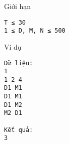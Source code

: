 Giới hạn
\begin{verbatim}
T ≤ 30
1 ≤ D, M, N ≤ 500
\end{verbatim}
Ví dụ
\begin{verbatim}
Dữ liệu:
1
1 2 4
D1 M1
D1 M1
D1 M2
M2 D1

Kết quả:
3

\end{verbatim}